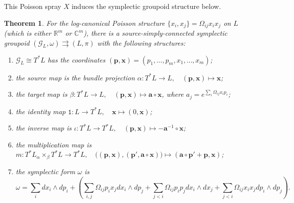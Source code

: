 \documentclass{amsart}
\newtheorem{theorem}{Theorem}[section]
\numberwithin{equation}{section}
\newcommand{\bfa}{\mathbf{a}}
\newcommand{\bfp}{\mathbf{p}}
\newcommand{\bfx}{\mathbf{x}}
\newcommand{\cG}{\mathcal{G}}
\newcommand{\CC}{\mathbb{C}}
\newcommand{\RR}{\mathbb{R}}
\newcommand{\rra}{\rightrightarrows}
\begin{document}
This Poisson spray $X$ induces the symplectic groupoid structure below.
\begin{theorem} 
  \label{thm:PoiSpLogC}
  For the log-canonical Poisson structure $\{x_i, x_j\} = \Omega_{ij} x_i x_j$ on $L$ (which is either $\RR^m$ or $\CC^m$), there is a source-simply-connected symplectic groupoid $(\cG_L, \omega) \rra (L, \pi)$ with the following structures:
  \begin{enumerate}
    \item $\cG_L \cong T^*L$ has the coordinates $(\bfp, \bfx) = (p_1, \ldots, p_m, x_1, \ldots, x_m)$;
    \item the source map is the bundle projection $\alpha: T^*L \to L, \quad (\bfp, \bfx) \mapsto \bfx$;
    \item the target map is $\beta: T^*L \to L, \quad (\bfp, \bfx) \mapsto \bfa \circ \bfx$, where $a_j = e^{\sum_i \Omega_{ij} x_ip_i}$;
	\item the identity map $\mathtt{1}: L \to T^*L, \quad \bfx \mapsto (0, \bfx)$;
    \item the inverse map is $\iota: T^*L \to T^*L, \quad (\bfp, \bfx) \mapsto -\bfa^{-1}\circ \bfx$;
    \item the multiplication map is $m: T^*L {_\alpha \times_\beta} T^*L \to T^*L, \quad \big((\bfp, \bfx), (\bfp', \bfa \circ \bfx)\big) \mapsto (\bfa \circ \bfp' + \bfp, \bfx )$;
    \item the symplectic form $\omega$ is
      \begin{equation}
        \label{eq:2-formG_A}
	\omega = \sum_{i} dx_i \wedge dp_i
	  + \left(
	    \sum_{i, j} \Omega_{ij}p_ix_j dx_i \wedge dp_j 
	    + \sum_{j < i} \Omega_{ij}p_ip_j dx_i \wedge dx_j
	    + \sum_{j < i} \Omega_{ij}x_ix_j dp_i \wedge dp_j
	  \right).
      \end{equation}
  \end{enumerate}
\end{theorem}
\end{document}
